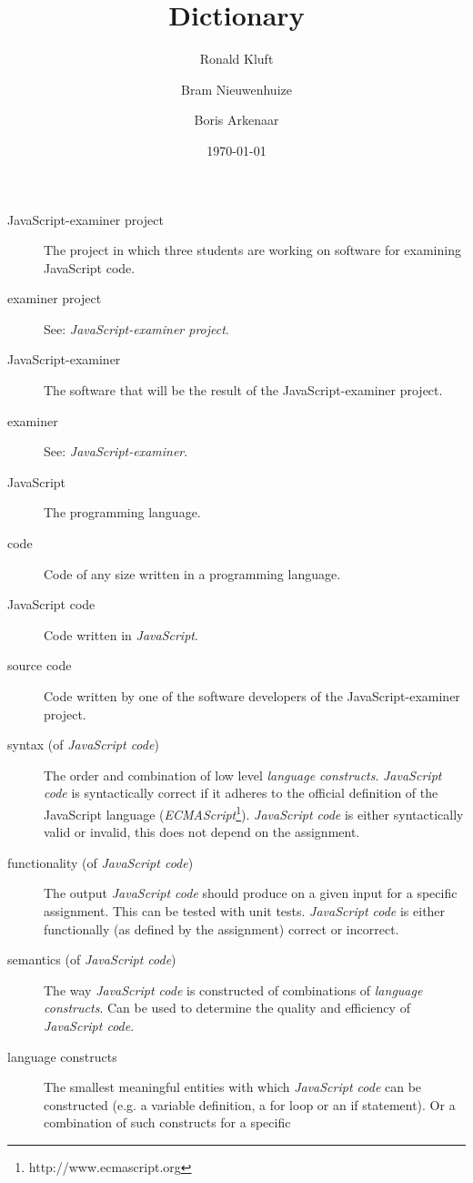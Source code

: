 \documentclass{article}
\begin{document}
\title{Dictionary}
\author{Ronald Kluft \and Bram Nieuwenhuize \and Boris Arkenaar}
\date{\today}
\maketitle

\begin{description}
  \item[JavaScript-examiner project] The project in which three students are
    working on software for examining JavaScript code.
  \item[examiner project] See: {\em JavaScript-examiner project}.
  \item[JavaScript-examiner] The software that will be the result of the
    JavaScript-examiner project.
  \item[examiner] See: {\em JavaScript-examiner}.
  \item[JavaScript] The programming language.
  \item[code] Code of any size written in a programming language.
  \item[JavaScript code] Code written in {\em JavaScript}.
  \item[source code] Code written by one of the software developers of the
    JavaScript-examiner project.
  \item[syntax (of {\em JavaScript code})] The order and combination of low
    level {\em language constructs}. {\em JavaScript code} is syntactically
    correct if it adheres to the official definition of the JavaScript language
    ({\em ECMAScript}\footnote{http://www.ecmascript.org}). {\em JavaScript
    code} is either syntactically valid or invalid, this does not depend on the
    assignment.
  \item[functionality (of {\em JavaScript code})] The output {\em JavaScript
    code} should produce on a given input for a specific assignment. This can
    be tested with unit tests. {\em JavaScript code} is either functionally (as
    defined by the assignment) correct or incorrect.
  \item[semantics (of {\em JavaScript code})] The way {\em JavaScript code} is
    constructed of combinations of {\em language constructs}. Can be used to
    determine the quality and efficiency of {\em JavaScript code}.
  \item[language constructs] The smallest meaningful entities with which {\em
    JavaScript code} can be constructed (e.g. a variable definition, a for loop
    or an if statement). Or a combination of such constructs for a specific

\end{description}
\end{document}
